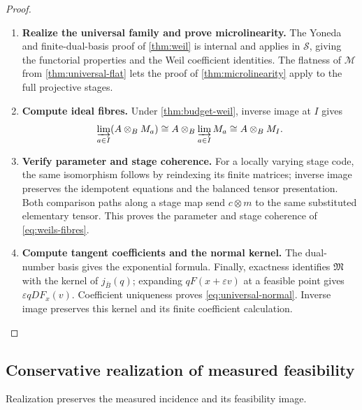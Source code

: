\documentclass[11pt,a4paper]{article}
\numberwithin{algorithm}{section}
\numberwithin{equation}{section}
\theoremstyle{definition}
\theoremstyle{remark}
\theoremstyle{plain}
\newcommand{\eps}{\varepsilon}
\theoremstyle{definition}
\theoremstyle{plain}
\begin{document}
\begin{proof}\leavevmode
\begin{enumerate}[leftmargin=*,align=left]
\item \textbf{Realize the universal family and prove microlinearity.}
The Yoneda and finite-dual-basis proof of \cref{thm:weil} is
internal and applies in $\mathscr S$, giving the functorial
properties and the Weil coefficient identities. The flatness
of $\mathscr M$ from \cref{thm:universal-flat} lets the proof
of \cref{thm:microlinearity} apply to the full projective stages.

\item \textbf{Compute ideal fibres.}
Under \cref{thm:budget-weil}, inverse image at $I$ gives
\[
 \varinjlim_{a\in I}(A\otimes_BM_a)
 \cong A\otimes_B\varinjlim_{a\in I}M_a
 \cong A\otimes_BM_I.
\]

\item \textbf{Verify parameter and stage coherence.}
For a locally varying stage code, the same isomorphism follows
by reindexing its finite matrices; inverse image preserves the
idempotent equations and the balanced tensor presentation.
Both comparison paths along a stage map send $c\otimes m$
to the same substituted elementary tensor. This proves the
parameter and stage coherence of \eqref{eq:weils-fibres}.

\item \textbf{Compute tangent coefficients and the normal kernel.}
The dual-number basis gives the exponential formula.
Finally, exactness identifies $\mathfrak M$ with the kernel
of $j_{\bar B}(q)$; expanding $qF(x+\eps v)$ at a feasible
point gives $\eps qDF_x(v)$. Coefficient uniqueness proves
\eqref{eq:universal-normal}. Inverse image preserves this
kernel and its finite coefficient calculation.
\end{enumerate}
\end{proof}


\subsection{Conservative realization of measured feasibility}
\label{sec:conservative-feasibility}
Realization preserves the measured incidence and its feasibility image.
\end{document}
